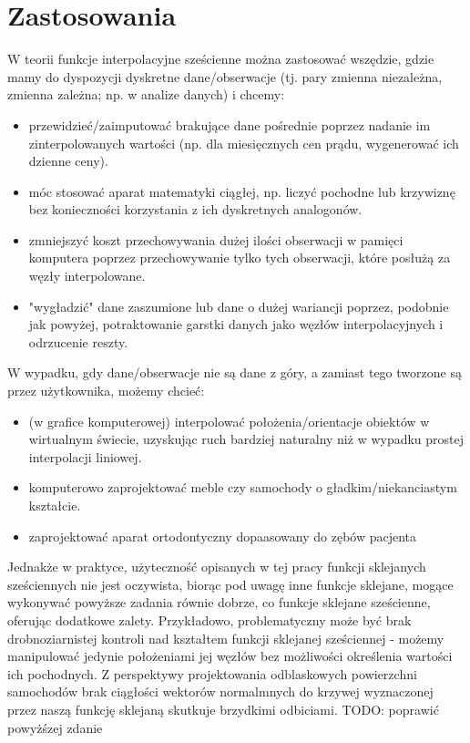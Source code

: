 \documentclass{article}
\begin{document}
\section{Zastosowania}
W teorii funkcje interpolacyjne sześcienne można zastosować wszędzie, gdzie mamy do dyspozycji dyskretne dane/obserwacje (tj. pary zmienna niezależna, zmienna zależna; np. w analize danych) i chcemy:
\begin{itemize}
    \item przewidzieć/zaimputować brakujące dane pośrednie poprzez nadanie im zinterpolowanych wartości (np. dla miesięcznych cen prądu, wygenerować ich dzienne ceny).
    \item móc stosować aparat matematyki ciągłej, np. liczyć pochodne lub krzywiznę bez konieczności korzystania z ich dyskretnych analogonów.
    \item zmniejszyć koszt przechowywania dużej ilości obserwacji w pamięci komputera poprzez przechowywanie tylko tych obserwacji, które posłużą za węzły interpolowane.
    \item "wygładzić" dane zaszumione lub dane o dużej wariancji poprzez, podobnie jak powyżej, potraktowanie garstki danych jako węzłów interpolacyjnych i odrzucenie reszty.
\end{itemize}

W wypadku, gdy dane/obserwacje nie są dane z góry, a zamiast tego tworzone są przez użytkownika, możemy chcieć:

\begin{itemize}
\item (w grafice komputerowej) interpolować położenia/orientacje obiektów w wirtualnym świecie, uzyskując ruch bardziej naturalny niż w wypadku prostej interpolacji liniowej.
\item komputerowo zaprojektować  meble czy samochody o gładkim/niekanciastym kształcie.
\item zaprojektować aparat ortodontyczny dopaasowany do zębów pacjenta \cite{Ahmad2012ApplicationOC}
\end{itemize} 

Jednakże w praktyce, użyteczność opisanych w tej pracy funkcji sklejanych sześciennych nie jest oczywista, biorąc pod uwagę inne funkcje sklejane, mogące wykonywać powyższe zadania równie dobrze, co funkcje sklejane sześcienne, oferując dodatkowe zalety. Przykładowo, problematyczny może być brak drobnoziarnistej kontroli nad kształtem funkcji sklejanej sześciennej - możemy manipulować jedynie położeniami jej węzłów bez możliwości określenia wartości ich  pochodnych. 
Z perspektywy projektowania odblaskowych powierzchni samochodów brak ciągłości wektorów normalmnych do krzywej wyznaczonej przez naszą funkcję sklejaną skutkuje brzydkimi odbiciami.
TODO: poprawić powyżśzej zdanie
\end{document}
